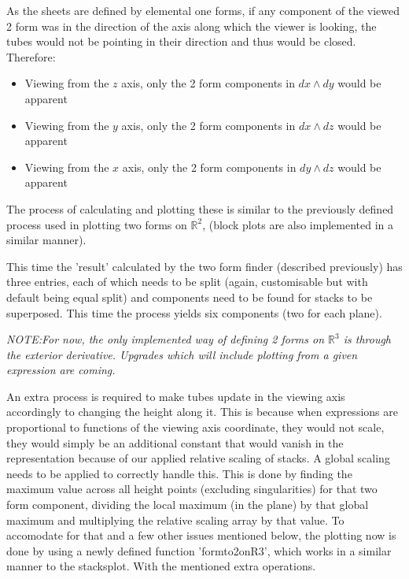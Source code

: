 \documentclass[11]{report}
\begin{document}
As the sheets are defined by elemental one forms, if any component of the viewed 2 form was in the direction of the axis along which the viewer is looking, the tubes would not be pointing in their direction and thus would be closed. Therefore:
\begin{itemize}
	\item Viewing from the $z$ axis, only the 2 form components in $dx\wedge dy$ would be apparent
	\item Viewing from the $y$ axis, only the 2 form components in $dx\wedge dz$ would be apparent
	\item Viewing from the $x$ axis, only the 2 form components in $dy\wedge dz$ would be apparent
\end{itemize} 

The process of calculating and plotting these is similar to the previously defined process used in plotting two forms on $\mathbb{R}^{2}$, (block plots are also implemented in a similar manner).

This time the 'result' calculated by the two form finder (described previously) has three entries, each of which needs to be split (again, customisable but with default being equal split) and components need to be found for stacks to be superposed. This time the process yields six components (two for each plane).

\textit{NOTE:For now, the only implemented way of defining 2 forms on $\mathbb{R}^{3}$ is through the exterior derivative. Upgrades which will include plotting from a given expression are coming.}

\noindent An extra process is required to make tubes update in the viewing axis accordingly to changing the height along it. This is because when expressions are proportional to functions of the viewing axis coordinate, they would not scale, they would simply be an additional constant that would vanish in the representation because of our applied relative scaling of stacks. A global scaling needs to be applied to correctly handle this.
This is done by finding the maximum value across all height points (excluding singularities) for that two form component, dividing the local maximum (in the plane) by that global maximum and multiplying the relative scaling array by that value.
To accomodate for that and a few other issues mentioned below, the plotting now is done by using a newly defined function 'form\textunderscore to\textunderscore 2onR3', which works in a similar manner to the stacks\textunderscore plot. With the mentioned extra operations.
\end{document}
